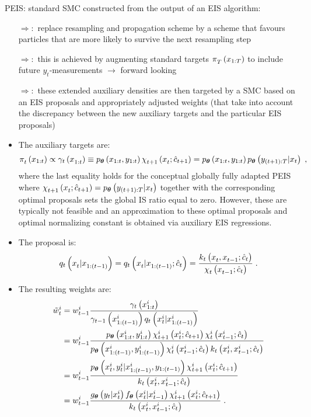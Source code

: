 PEIS: standard SMC constructed from the output of an EIS algorithm:
\begin{itemize}
\item[$\Rightarrow :$]replace resampling and propagation scheme by a scheme that favours particles that are more likely to survive the next resampling step
\item[$\Rightarrow :$]this is achieved by augmenting  standard targets $\pi_T^{}\left(x_{1:T}\right)$ to include future $y_t$-measurements $\rightarrow$ forward looking 
\item[$\Rightarrow :$]these extended auxiliary densities are then targeted by a SMC based on an EIS proposals and appropriately adjusted weights (that take into account the discrepancy between the new auxiliary targets and the particular EIS proposals)
\end{itemize}
\begin{itemize}
\item The auxiliary targets are:
\begin{align*}
\pi_t^{}\left(x_{1:t}\right) 
\propto
\gamma_t\left(x_{1:t}^{}\right) 
\equiv
p_{\boldsymbol{\theta}}\left(x_{1:t}, y_{1:t}\right) \chi_{t+1}^{}\left(x_{t}^{}; \hat{c}_{t+1}\right)
= p_{\boldsymbol{\theta}}\left(x_{1:t}, y_{1:t}\right) p_{\boldsymbol{\theta}}\left(y_{(t+1):T}\lvert x_{t}\right)\;,
\end{align*} 
where the last equality holds for the conceptual globally fully adapted PEIS where $\chi_{t+1}^{}\left(x_{t}^{}; \hat{c}_{t+1}\right)=p_{\boldsymbol{\theta}}\left(y_{(t+1):T}\lvert x_{t}\right)$ together with the corresponding optimal proposals sets the global IS ratio equal to zero. However, these are typically not feasible and an approximation to these optimal proposals and optimal normalizing constant is obtained via auxiliary EIS regressions.
\item The proposal is: 
\begin{align*}
q_t\left(x_t^{} \lvert x_{1:(t-1)}^{}\right)= q_t\left(x_t^{} \lvert x_{1:(t-1)}^{}; \hat{c}_t\right) = \frac{k_{t}\left(x_{t}^{}, x_{t-1}^{}; \hat{c}_{t}\right) }{\chi_{t}^{}\left(x_{t-1}^{}; \hat{c}_{t}\right)}\;.
\end{align*}
\item The resulting weights are:
\begin{align*}
\tilde{w}_t^i
&= 
w_{t-1}^i
\frac
{\gamma_t\left(x_{1:t}^{i}\right)}
{\gamma_{t-1}\left(x_{1:(t-1)}^{i}\right)q_t\left(x_t^{i} \lvert x_{1:(t-1)}^{i}\right)}\\
&=
w_{t-1}^i 
\frac{p_{\boldsymbol{\theta}}\left(x_{1:t}^i, y_{1:t}^i\right)\chi_{t+1}^{i}\left(x_{t}^{i}; \hat{c}_{t+1}\right)
\chi_{t}^{i}\left(x_{t-1}^{i}; \hat{c}_{t}\right)}
{p_{\boldsymbol{\theta}}\left(x_{1:(t-1)}^i, y_{1:(t-1)}^i\right)\chi_{t}^{i}\left(x_{t-1}^{i}; \hat{c}_{t}\right)
k_{t}\left(x_{t}^{i}, x_{t-1}^{i}; \hat{c}_{t}\right)} \\
&=
w_{t-1}^i \frac{p_{\boldsymbol{\theta}}\left(x_t^i, y_t^i \lvert x_{1:(t-1)}^i, y_{1:(t-1)}\right)
\chi_{t+1}^{i}\left(x_{t}^{i}; \hat{c}_{t+1}\right)}
{k_{t}\left(x_{t}^{i}, x_{t-1}^{i}; \hat{c}_{t}\right)} \\
&=
w_{t-1}^i \frac{g_{\boldsymbol{\theta}}\left(y_t \lvert x_t^i\right) f_{\boldsymbol{\theta}}\left(x_t^i \lvert x_{t-1}^i\right)
\chi_{t+1}^{i}\left(x_{t}^{i}; \hat{c}_{t+1}\right)}
{k_{t}\left(x_{t}^{i}, x_{t-1}^{i}; \hat{c}_{t}\right)}\;.
\end{align*}
\end{itemize}
\newpage
